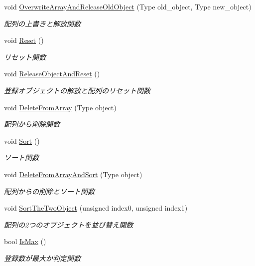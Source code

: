 \begin{DoxyCompactItemize}
void \mbox{\hyperlink{class_limited_pointer_array_a6c46bb77df04a9e1226025f8c48e26cb}{Overwrite\+Array\+And\+Release\+Old\+Object}} (Type old\+\_\+object, Type new\+\_\+object)
\begin{DoxyCompactList}\small\item\em 配列の上書きと解放関数 \end{DoxyCompactList}\item 
void \mbox{\hyperlink{class_limited_pointer_array_a762f1dd92e84cdd1fedbc0e45d72fc3c}{Reset}} ()
\begin{DoxyCompactList}\small\item\em リセット関数 \end{DoxyCompactList}\item 
void \mbox{\hyperlink{class_limited_pointer_array_af93d94163b061eb06337a2ead743d958}{Release\+Object\+And\+Reset}} ()
\begin{DoxyCompactList}\small\item\em 登録オブジェクトの解放と配列のリセット関数 \end{DoxyCompactList}\item 
void \mbox{\hyperlink{class_limited_pointer_array_a02cfaed541d27980883ec9eb90ad3813}{Delete\+From\+Array}} (Type object)
\begin{DoxyCompactList}\small\item\em 配列から削除関数 \end{DoxyCompactList}\item 
void \mbox{\hyperlink{class_limited_pointer_array_ab74449f9eacc2e3df53ab35678f680c5}{Sort}} ()
\begin{DoxyCompactList}\small\item\em ソート関数 \end{DoxyCompactList}\item 
void \mbox{\hyperlink{class_limited_pointer_array_a2265f07827e70c2b154e8af1a4007efd}{Delete\+From\+Array\+And\+Sort}} (Type object)
\begin{DoxyCompactList}\small\item\em 配列からの削除とソート関数 \end{DoxyCompactList}\item 
void \mbox{\hyperlink{class_limited_pointer_array_a0d33dc5dd8ed01bb00accd6378aa1b47}{Sort\+The\+Two\+Object}} (unsigned index0, unsigned index1)
\begin{DoxyCompactList}\small\item\em 配列の2つのオブジェクトを並び替え関数 \end{DoxyCompactList}\item 
bool \mbox{\hyperlink{class_limited_pointer_array_a8bd3a7ea969f307c35934a1bf2803b40}{Is\+Max}} ()
\begin{DoxyCompactList}\small\item\em 登録数が最大か判定関数 \end{DoxyCompactList}\end{DoxyCompactItemize}
